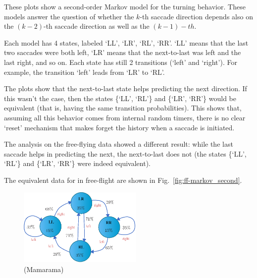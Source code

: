 These plots show a second-order Markov model for the turning behavior. These models answer the question of whether the $k$-th saccade direction depends also on the $(k-2)$-th saccade direction as well as the $(k-1)-th$. 

Each model has 4 states, labeled `LL',  `LR', `RL', `RR'. `LL' means that the last two saccades were both left, `LR' means that the next-to-last was left and the last right, and so on. Each state has still 2 transitions (`left' and `right'). For example, the transition `left' leads from  `LR' to `RL'.

The plots show that the next-to-last state helps predicting the next direction. If this wasn't the case, then the states \{`LL', `RL'\} and \{`LR', `RR'\} would be equivalent (that is, having the same transition probabilities).
This shows that, assuming all this behavior comes from internal random timers, there is no clear `reset' mechanism that makes forget the history when a saccade is initiated. 

The analysis on the free-flying data showed a different result: while the last saccade helps in predicting the next, the next-to-last does not (the states \{`LL', `RL'\} and \{`LR', `RR'\} were indeed equivalent).

The equivalent data for  \Dmelanogaster in free-flight  are shown in Fig.~\vref{fig:ff-markov_second}.

\vfill
\begin{figure}[h!]
	\centering
	\includegraphics[width=6cm]{../comments/freeflight/markov_second}
	\caption{ \label{fig:ff-markov_second}   \Dmelanogaster (Mamarama) }
\end{figure}